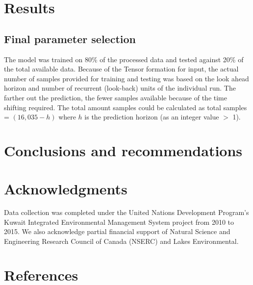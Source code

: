 \documentclass[preprint,12pt,authoryear]{elsarticle}
\begin{document}
\begin{linenumbers}
\section{Results}
\subsection{Final parameter selection}
The model was trained on 80\% of the processed data and tested against 20\% of the total available data. Because of the Tensor formation for input, the actual number of samples provided for training and testing was based on the look ahead horizon and number of recurrent (look-back) units of the individual run. The farther out the prediction, the fewer samples available because of the time shifting required. The total amount samples could be calculated as total samples = $(16,035 - h)$ where $h$ is the prediction horizon (as an integer value $>$ 1). 

\section{Conclusions and recommendations}


\section{Acknowledgments}
Data collection was completed under the United Nations Development Program's Kuwait Integrated Environmental Management System project from 2010 to 2015.  We also acknowledge partial financial support of Natural Science and Engineering Research Council of Canada (NSERC) and Lakes Environmental.
 
\section{References}

\end{linenumbers}
{}

\end{document}
